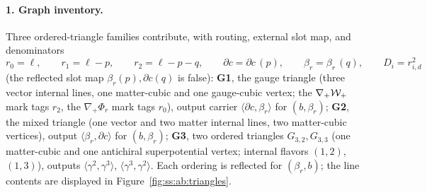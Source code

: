\paragraph{1. Graph inventory.} Three ordered-triangle families contribute, with routing, external slot map, and denominators
\begin{equation}\label{eq:ss:ab:routing}
r_0=\ell,\qquad r_1=\ell-p,\qquad r_2=\ell-p-q,\qquad
\partial c=\partial c\,(p),\qquad \beta_r=\beta_r\,(q),\qquad D_i=r_{i,d}^{2}
\end{equation}
(the reflected slot map $\beta_r(p),\partial c(q)$ is false): \textbf{G1}, the gauge triangle (three vector internal lines, one matter-cubic and one gauge-cubic vertex; the $\nabla_+\mathcal{W}_+$ mark tags $r_2$, the $\nabla_+\Phi_r$ mark tags $r_0$), output carrier $\langle\partial c,\beta_r\rangle$ for $(b,\beta_r)$; \textbf{G2}, the mixed triangle (one vector and two matter internal lines, two matter-cubic vertices), output $\langle\beta_r,\partial c\rangle$ for $(b,\beta_r)$; \textbf{G3}, two ordered triangles $G_{3,2},G_{3,3}$ (one matter-cubic and one antichiral superpotential vertex; internal flavors $(1,2)$, $(1,3)$), outputs $\langle\gamma^2,\gamma^3\rangle$, $\langle\gamma^3,\gamma^2\rangle$. Each ordering is reflected for $(\beta_r,b)$; the line contents are displayed in Figure~\ref{fig:ss:ab:triangles}.
